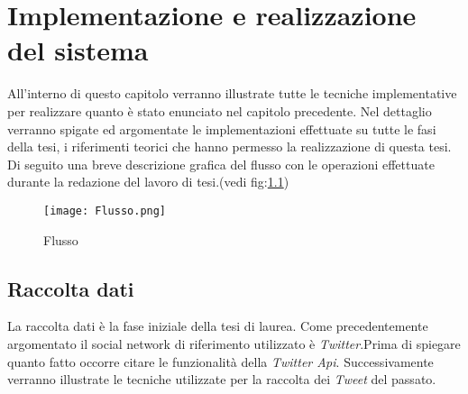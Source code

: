 \chapter{Implementazione e realizzazione del sistema}
\label{capitolo5}
\thispagestyle{empty}



\noindent All'interno di questo capitolo verranno illustrate tutte le tecniche implementative per realizzare quanto è stato enunciato nel capitolo precedente. Nel dettaglio verranno spigate ed argomentate le implementazioni effettuate su tutte le fasi della tesi, i riferimenti teorici che hanno permesso la realizzazione di questa tesi. Di seguito una breve descrizione grafica del flusso con le operazioni effettuate durante la redazione del lavoro di tesi.(vedi fig:\ref{Flusso})
\begin{figure}[h!]
    \begin{center}
      \texttt{[image: Flusso.png]}
	\caption{Flusso}
	\label{Flusso}
    \end{center}
  \end{figure}

\section{Raccolta dati}
\label{raccolta}
La raccolta dati è la fase iniziale della tesi di laurea. Come precedentemente argomentato il social network di riferimento utilizzato è \textit{Twitter}.Prima di spiegare quanto fatto occorre citare le funzionalità della \textit{Twitter Api}. Successivamente verranno illustrate le tecniche utilizzate per la raccolta dei \textit{Tweet} del passato.
